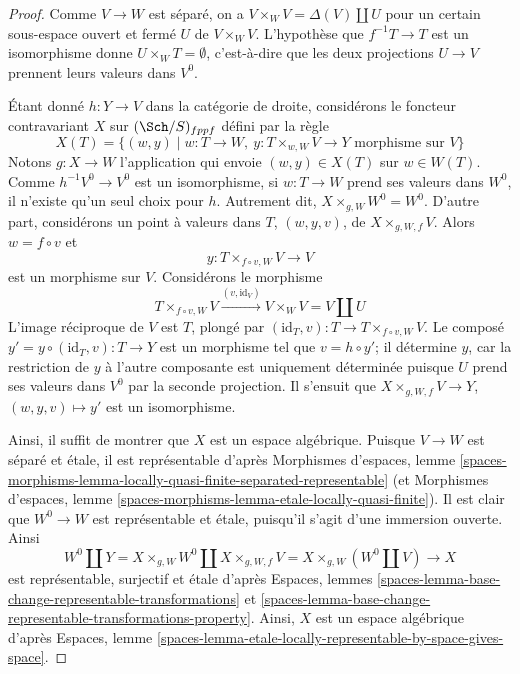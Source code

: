 \begin{proof}
Comme $V \to W$ est séparé, on a
$V \times_W V = \Delta(V) \amalg U$ pour un certain sous-espace ouvert et fermé
$U$ de $V \times_W V$. L'hypothèse que $f^{-1}T \to T$ est un
isomorphisme donne $U \times_W T = \emptyset$, c'est-à-dire que les deux
projections $U \to V$ prennent leurs valeurs dans $V^0$.

\medskip\noindent
Étant donné $h : Y \to V$ dans la catégorie de droite, considérons le
foncteur contravariant $X$ sur $(\Sch/S)_{fppf}$ défini par la règle
$$
X(T) = \{(w, y) \mid
w :  T \to W,\ y : T \times_{w, W} V \to Y\text{ morphisme sur }V\}
$$
Notons $g : X \to W$ l'application qui envoie $(w, y) \in X(T)$ sur $w \in W(T)$.
Comme $h^{-1}V^0 \to V^0$ est un isomorphisme, si
$w : T \to W$ prend ses valeurs dans $W^0$, il n'existe qu'un seul choix pour $h$.
Autrement dit, $X \times_{g, W} W^0 = W^0$. D'autre part, considérons
un point à valeurs dans $T$, $(w, y, v)$, de $X \times_{g, W, f} V$.
Alors $w = f \circ v$ et
$$
y : T \times_{f \circ v, W} V \longrightarrow V
$$
est un morphisme sur $V$. Considérons le morphisme
$$
T \times_{f \circ v, W} V \xrightarrow{(v, \text{id}_V)}
V \times_W V = V \amalg U
$$
L'image réciproque de $V$ est $T$, plongé par
$(\text{id}_T, v) : T \to T \times_{f \circ v, W} V$.
Le composé $y' = y \circ (\text{id}_T, v) : T \to Y$
est un morphisme tel que $v = h \circ y'$; il détermine $y$, car la
restriction de $y$ à l'autre composante est uniquement déterminée puisque
$U$ prend ses valeurs dans $V^0$ par la seconde projection. Il s'ensuit que
$X \times_{g, W, f} V \to Y$, $(w, y, v) \mapsto y'$ est un isomorphisme.

\medskip\noindent
Ainsi, il suffit de montrer que $X$ est un espace algébrique.
Puisque $V \to W$ est séparé et \'etale, il est représentable d'après
Morphismes d'espaces, lemme
\ref{spaces-morphisms-lemma-locally-quasi-finite-separated-representable}
(et Morphismes d'espaces, lemme
\ref{spaces-morphisms-lemma-etale-locally-quasi-finite}).
Il est clair que $W^0 \to W$ est représentable et \'etale, puisqu'il s'agit d'une
immersion ouverte. Ainsi
$$
W^0 \amalg Y = X \times_{g, W} W^0 \amalg X \times_{g, W, f} V
= X \times_{g, W} (W^0 \amalg V) \longrightarrow X
$$
est représentable, surjectif et \'etale d'après Espaces, lemmes
\ref{spaces-lemma-base-change-representable-transformations} et
\ref{spaces-lemma-base-change-representable-transformations-property}.
Ainsi, $X$ est un espace
algébrique d'après Espaces, lemme
\ref{spaces-lemma-etale-locally-representable-by-space-gives-space}.
\end{proof}

